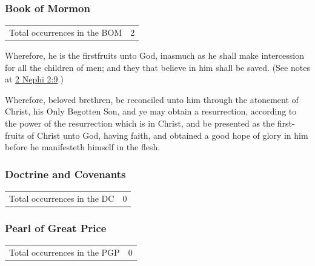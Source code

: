	\subsubsection{Book of Mormon} %
		\label{FIRSTFRUITS-BOM}
	
		\begin{tabular}{ll}
			Total occurrences in the BOM & 2
		\end{tabular}
		
		\begin{compactdesc}
			\item[2 Nephi 2:9] Wherefore, he is the firstfruits unto God, inasmuch as he shall make intercession for all the children of men; and they that believe in him shall be saved. (See notes at \hyperref[2NEPHI-2-9]{2 Nephi 2:9}.)
			\item[Jacob 4:11] Wherefore, beloved brethren, be reconciled unto him through the atonement of Christ, his Only Begotten Son, and ye may obtain a resurrection, according to the power of the resurrection which is in Christ, and be presented as the first-fruits of Christ unto God, having faith, and obtained a good hope of glory in him before he manifesteth himself in the flesh.
		\end{compactdesc}
		
	\subsubsection{Doctrine and Covenants} %
		\label{FIRSTFRUITS-DC}
	
		\begin{tabular}{ll}
			Total occurrences in the DC & 0
		\end{tabular}
		
		
	\subsubsection{Pearl of Great Price} %
		\label{FIRSTFRUITS-PGP}
	
		\begin{tabular}{ll}
			Total occurrences in the PGP & 0
		\end{tabular}
		
		
